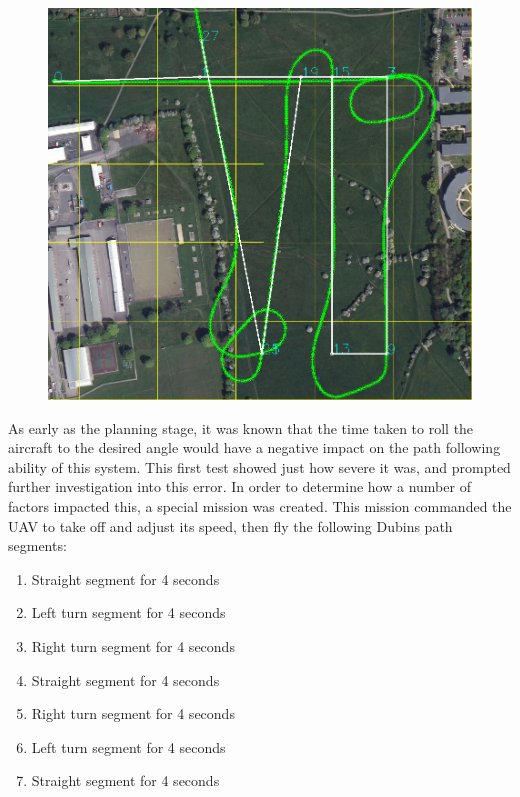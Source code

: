 \begin{figure}[htbp!] 
\centering    
\includegraphics[width=\textwidth]{65_20_NoWind}
\caption[]{}
\label{fig:6520nowind}
\end{figure} 

As early as the planning stage, it was known that the time taken to roll the aircraft to the desired angle would have a negative impact on the path following ability of this system. This first test showed just how severe it was, and prompted further investigation into this error. In order to determine how a number of factors impacted this, a special mission was created. This mission commanded the UAV to take off and adjust its speed, then fly the following Dubins path segments:

\begin{enumerate}
	\item Straight segment for 4 seconds
	\item Left turn segment for 4 seconds
	\item Right turn segment for 4 seconds
	\item Straight segment for 4 seconds
	\item Right turn segment for 4 seconds
	\item Left turn segment for 4 seconds
	\item Straight segment for 4 seconds
\end{enumerate}

